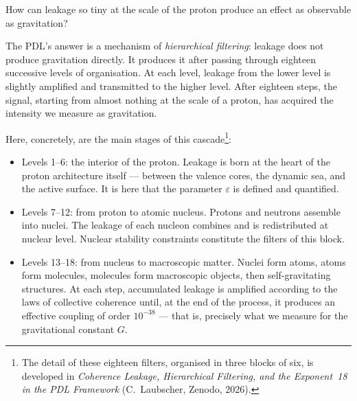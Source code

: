 \documentclass[12pt, a4paper, openright]{book}
\begin{document}
How can leakage so tiny at the scale of the proton produce an effect as observable as gravitation?

The PDL’s answer is a mechanism of \emph{hierarchical filtering}: leakage does not produce gravitation directly. It produces it after passing through eighteen successive levels of organisation. At each level, leakage from the lower level is slightly amplified and transmitted to the higher level. After eighteen steps, the signal, starting from almost nothing at the scale of a proton, has acquired the intensity we measure as gravitation.

Here, concretely, are the main stages of this cascade\footnote{%
  The detail of these eighteen filters, organised in three blocks of six, is developed in \emph{Coherence Leakage, Hierarchical Filtering, and the Exponent~18 in the PDL Framework} (C.~Laubscher, Zenodo, 2026).}:

\begin{itemize}
  \item Levels 1–6: the interior of the proton. Leakage is born at the heart of the proton architecture itself — between the valence cores, the dynamic sea, and the active surface. It is here that the parameter $\varepsilon$ is defined and quantified.
  \item Levels 7–12: from proton to atomic nucleus. Protons and neutrons assemble into nuclei. The leakage of each nucleon combines and is redistributed at nuclear level. Nuclear stability constraints constitute the filters of this block.
  \item Levels 13–18: from nucleus to macroscopic matter. Nuclei form atoms, atoms form molecules, molecules form macroscopic objects, then self-gravitating structures. At each step, accumulated leakage is amplified according to the laws of collective coherence until, at the end of the process, it produces an effective coupling of order $10^{-38}$ — that is, precisely what we measure for the gravitational constant $G$.
\end{itemize}

\medskip
\end{document}

